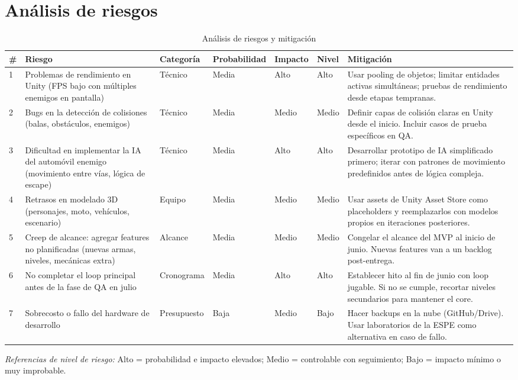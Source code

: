 \section{Análisis de riesgos}

\begin{table}[H]
    \centering
    \small
    \begin{tabular}{|p{0.5cm}|p{3.2cm}|p{1.8cm}|p{1.2cm}|p{1.2cm}|p{1.0cm}|p{3.5cm}|}
        \hline
        \textbf{\#} & \textbf{Riesgo} & \textbf{Categoría} & \textbf{Probabilidad} & \textbf{Impacto} & \textbf{Nivel} & \textbf{Mitigación} \\
        \hline
        1 & Problemas de rendimiento en Unity (FPS bajo con múltiples enemigos en pantalla) & Técnico & Media & Alto & Alto & Usar pooling de objetos; limitar entidades activas simultáneas; pruebas de rendimiento desde etapas tempranas. \\
        \hline
        2 & Bugs en la detección de colisiones (balas, obstáculos, enemigos) & Técnico & Media & Medio & Medio & Definir capas de colisión claras en Unity desde el inicio. Incluir casos de prueba específicos en QA. \\
        \hline
        3 & Dificultad en implementar la IA del automóvil enemigo (movimiento entre vías, lógica de escape) & Técnico & Media & Alto & Alto & Desarrollar prototipo de IA simplificado primero; iterar con patrones de movimiento predefinidos antes de lógica compleja. \\
        \hline
        4 & Retrasos en modelado 3D (personajes, moto, vehículos, escenario) & Equipo & Media & Medio & Medio & Usar assets de Unity Asset Store como placeholders y reemplazarlos con modelos propios en iteraciones posteriores. \\
        \hline
        5 & Creep de alcance: agregar features no planificadas (nuevas armas, niveles, mecánicas extra) & Alcance & Media & Medio & Medio & Congelar el alcance del MVP al inicio de junio. Nuevas features van a un backlog post-entrega. \\
        \hline
        6 & No completar el loop principal antes de la fase de QA en julio & Cronograma & Media & Alto & Alto & Establecer hito al fin de junio con loop jugable. Si no se cumple, recortar niveles secundarios para mantener el core. \\
        \hline
        7 & Sobrecosto o fallo del hardware de desarrollo & Presupuesto & Baja & Medio & Bajo & Hacer backups en la nube (GitHub/Drive). Usar laboratorios de la ESPE como alternativa en caso de fallo. \\
        \hline
    \end{tabular}
    \caption{Análisis de riesgos y mitigación}
    \label{tab:riesgos}
\end{table}

\noindent\textit{Referencias de nivel de riesgo:} Alto = probabilidad e impacto elevados; Medio = controlable con seguimiento; Bajo = impacto mínimo o muy improbable.
